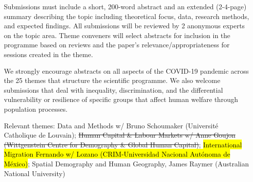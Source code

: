 Submissions must include a short, 200-word abstract and an extended (2-4-page) summary describing the topic including theoretical focus, data, research methods, and expected findings. All submissions will be reviewed by 2 anonymous experts on the topic area. Theme conveners will select abstracts for inclusion in the programme based on reviews and the paper’s relevance/appropriateness for sessions created in the theme.

We strongly encourage abstracts on all aspects of the COVID-19 pandemic across the 25 themes that structure the scientific programme. We also welcome submissions that deal with inequality, discrimination, and the differential vulnerability or resilience of specific groups that affect human welfare through population processes.

Relevant themes: Data and Methods w/ Bruno Schoumaker (Université Catholique de Louvain); \sout{Human Capital \& Labour Markets w/ Anne Goujon (Wittgenstein Centre for Demography \& Global Human Capital)}; \hl{International Migration Fernando w/ Lozano (CRIM-Universidad Nacional Autónoma de México)}; Spatial Demography and Human Geography, James Raymer (Australian National University)